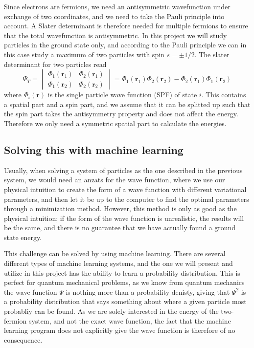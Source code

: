 \documentclass[norsk,a4paper,12pt]{article}
\begin{document}
Since electrons are fermions, we need an antisymmetric wavefunction under exchange of two coordinates, and we need to take the Pauli principle into account. A Slater determinant is therefore needed for multiple fermions to ensure that the total wavefunction is antisymmetric. In this project we will study particles in the ground state only, and according to the Pauli principle we can in this case study a maximum of two particles with spin $s=\pm 1/2$. The slater determinant for two particles read
\begin{equation}
\Psi_T=
\begin{vmatrix}
\Phi_1(\boldsymbol{r}_1) & \Phi_2(\boldsymbol{r}_1)\\
\Phi_1(\boldsymbol{r}_2) & \Phi_2(\boldsymbol{r}_2)
\end{vmatrix}
=\Phi_1(\boldsymbol{r}_1)\Phi_2(\boldsymbol{r}_2)-\Phi_2(\boldsymbol{r}_1)\Phi_1(\boldsymbol{r}_2)
\end{equation}
where $\Phi_i(\boldsymbol{r})$ is the single particle wave function (SPF) of state $i$. This contains a spatial part and a spin part, and we assume that it can be splitted up such that the spin part takes the antisymmetry property and does not affect the energy. Therefore we only need a symmetric spatial part to calculate the energies.

\subsection{Solving this with machine learning}
Usually, when solving a system of particles as the one described in the previous system, we would need an anzats for the wave function, where we use our physical intuition to create the form of a wave function with different variational parameters, and then let it be up to the computer to find the optimal parameters through a minimization method. However, this method is only as good as the physical intuition; if the form of the wave function is unrealistic, the results will be the same, and there is no guarantee that we have actually found a ground state energy.
\par 
\vspace{3mm}
This challenge can be solved by using machine learning. There are several different types of machine learning systems, and the one we will present and utilize in this project has the ability to learn a probability distribution. This is perfect for quantum mechanical problems, as we know from quantum mechanics the wave function $\Psi$ is nothing more than a probability denisty, giving that $\Psi^2$ is a probability distribution that says something about where a given particle most probabliy can be found. As we are solely interested in the energy of the two-fermion system, and not the exact wave function, the fact that the machine learning program does not explicitly give the wave function is therefore of no consequence.
\end{document}
